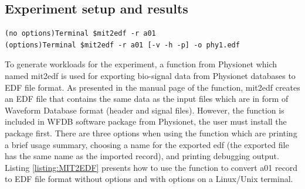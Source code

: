 \subsection{Experiment setup and results}
\begin{lstlisting}[caption={Convert mit2edf by using terminal}, label = {listing:MIT2EDF}, captionpos=b]
(no options)Terminal $mit2edf -r a01 
(options)Terminal $mit2edf -r a01 [-v -h -p] -o phy1.edf
\end{lstlisting}
To generate workloads for the experiment, a function from Physionet which named mit2edf is used for exporting bio-signal data from Physionet databases to EDF file format. As presented in the manual page of the function, mit2edf creates an EDF file that contains the same data as the input files which are in form of Waveform Database format (header and signal files). However, the function is included in WFDB software package from Physionet, the user must install the package first. There are three options when using the function which are printing a brief usage summary, choosing a name for the exported edf (the exported file has the same name as the imported record), and printing debugging output. Listing \ref{listing:MIT2EDF} presents how to use the function to convert a01 record to EDF file format without options and with options on a Linux/Unix terminal.

